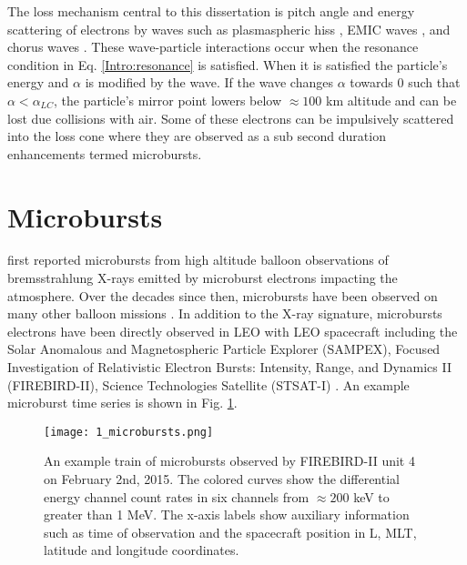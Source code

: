 The loss mechanism central to this dissertation is pitch angle and energy scattering of electrons by waves such as plasmaspheric hiss \citep[e.g.][]{Breneman2015}, EMIC waves \citep[e.g.][]{Capannolo2019energetic}, and chorus waves \citep[e.g.][]{Breneman2017}. These wave-particle interactions occur when the resonance condition in Eq. \ref{Intro:resonance} is satisfied. When it is satisfied the particle's energy and $\alpha$ is modified by the wave. If the wave changes $\alpha$ towards $0$ such that $\alpha < \alpha_{LC}$, the particle's mirror point lowers below $\approx 100$ km altitude and can be lost due collisions with air. Some of these electrons can be impulsively scattered into the loss cone where they are observed as a sub second duration enhancements termed microbursts.



\section{Microbursts}\label{Intro:microbursts}
\citet{Anderson1964} first reported microbursts from high altitude balloon observations of bremsstrahlung X-rays emitted by microburst electrons impacting the atmosphere. Over the decades since then, microbursts have been observed on many other balloon missions \citep[e.g.][]{Anderson2017, Parks1967, Woodger2015}. In addition to the X-ray signature, microbursts electrons have been directly observed in LEO with LEO spacecraft including the Solar Anomalous and Magnetospheric Particle Explorer (SAMPEX), Focused Investigation of Relativistic Electron Bursts: Intensity, Range, and Dynamics II (FIREBIRD-II), Science Technologies Satellite (STSAT-I)  \citep[e.g.][]{Blake1996, Blum2015, Lorentzen2001a, Lorentzen2001b, Nakamura1995, Nakamura2000, O'Brien2003, O'Brien2004, Crew2016, Breneman2017, Lee2005, Lee2012}. An example microburst time series is shown in Fig. \ref{Intro:microbursts}.

\begin{figure}
\texttt{[image: 1\_microbursts.png]}
\caption{An example train of microbursts observed by FIREBIRD-II unit 4 on February 2nd, 2015. The colored curves show the differential energy channel count rates in six channels from $\approx 200$ keV to greater than 1 MeV. The x-axis labels show auxiliary information such as time of observation and the spacecraft position in L, MLT, latitude and longitude coordinates.}
\label{Intro:microbursts}
\end{figure}

